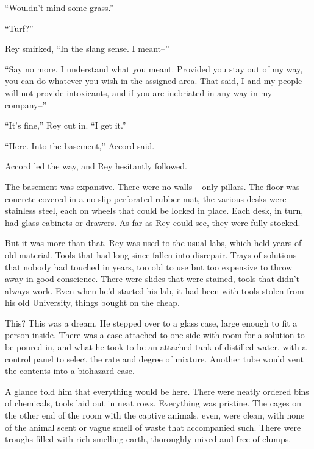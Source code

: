 ``Wouldn't mind some grass.''



``Turf?''



Rey smirked, ``In the slang sense.  I meant--''



``Say no more.  I understand what you meant.  Provided you stay out of my way, you can do whatever you wish in the assigned area.  That said, I and my people will not provide intoxicants, and if you are inebriated in any way in my company--''



``It's fine,'' Rey cut in.  ``I get it.''



``Here.  Into the basement,'' Accord said.



Accord led the way, and Rey hesitantly followed.



The basement was expansive.  There were no walls – only pillars.  The floor was concrete covered in a no-slip perforated rubber mat, the various desks were stainless steel, each on wheels that could be locked in place.  Each desk, in turn, had glass cabinets or drawers.  As far as Rey could see, they were fully stocked.



But it was more than that.  Rey was used to the usual labs, which held years of old material.  Tools that had long since fallen into disrepair.  Trays of solutions that nobody had touched in years, too old to use but too expensive to throw away in good conscience.  There were slides that were stained, tools that didn't always work.  Even when he'd started his lab, it had been with tools stolen from his old University, things bought on the cheap.



This?  This was a dream.  He stepped over to a glass case, large enough to fit a person inside.  There was a case attached to one side with room for a solution to be poured in, and what he took to be an attached tank of distilled water, with a control panel to select the rate and degree of mixture.  Another tube would vent the contents into a biohazard case.



A glance told him that everything would be here.  There were neatly ordered bins of chemicals, tools laid out in neat rows.  Everything was pristine.  The cages on the other end of the room with the captive animals, even, were clean, with none of the animal scent or vague smell of waste that accompanied such.  There were troughs filled with rich smelling earth, thoroughly mixed and free of clumps.



